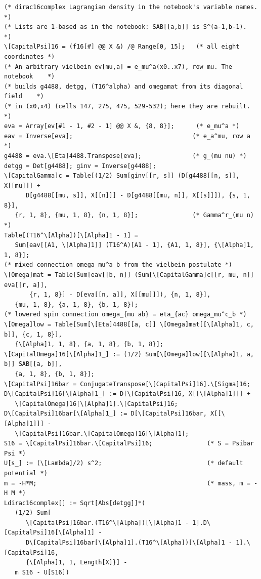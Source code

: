 \documentclass[11pt]{article}
\begin{document}
\begin{Verbatim}[fontsize=\small]
(* dirac16complex Lagrangian density in the notebook's variable names.     *)
(* Lists are 1-based as in the notebook: SAB[[a,b]] is S^(a-1,b-1).        *)
\[CapitalPsi]16 = (f16[#] @@ X &) /@ Range[0, 15];   (* all eight coordinates *)
(* An arbitrary vielbein ev[mu,a] = e_mu^a(x0..x7), row mu. The notebook    *)
(* builds g4488, detgg, (T16^alpha) and omegamat from its diagonal field    *)
(* in (x0,x4) (cells 147, 275, 475, 529-532); here they are rebuilt.        *)
eva = Array[ev[#1 - 1, #2 - 1] @@ X &, {8, 8}];      (* e_mu^a *)
eav = Inverse[eva];                                 (* e_a^mu, row a *)
g4488 = eva.\[Eta]4488.Transpose[eva];              (* g_(mu nu) *)
detgg = Det[g4488]; ginv = Inverse[g4488];
\[CapitalGamma]c = Table[(1/2) Sum[ginv[[r, s]] (D[g4488[[n, s]], X[[mu]]] +
      D[g4488[[mu, s]], X[[n]]] - D[g4488[[mu, n]], X[[s]]]), {s, 1, 8}],
   {r, 1, 8}, {mu, 1, 8}, {n, 1, 8}];               (* Gamma^r_(mu n) *)
Table[(T16^\[Alpha])[\[Alpha]1 - 1] =
   Sum[eav[[A1, \[Alpha]1]] (T16^A)[A1 - 1], {A1, 1, 8}], {\[Alpha]1, 1, 8}];
(* mixed connection omega_mu^a_b from the vielbein postulate *)
\[Omega]mat = Table[Sum[eav[[b, n]] (Sum[\[CapitalGamma]c[[r, mu, n]] eva[[r, a]],
       {r, 1, 8}] - D[eva[[n, a]], X[[mu]]]), {n, 1, 8}],
   {mu, 1, 8}, {a, 1, 8}, {b, 1, 8}];
(* lowered spin connection omega_{mu ab} = eta_{ac} omega_mu^c_b *)
\[Omega]low = Table[Sum[\[Eta]4488[[a, c]] \[Omega]mat[[\[Alpha]1, c, b]], {c, 1, 8}],
   {\[Alpha]1, 1, 8}, {a, 1, 8}, {b, 1, 8}];
\[CapitalOmega]16[\[Alpha]1_] := (1/2) Sum[\[Omega]low[[\[Alpha]1, a, b]] SAB[[a, b]],
   {a, 1, 8}, {b, 1, 8}];
\[CapitalPsi]16bar = ConjugateTranspose[\[CapitalPsi]16].\[Sigma]16;
D\[CapitalPsi]16[\[Alpha]1_] := D[\[CapitalPsi]16, X[[\[Alpha]1]]] +
   \[CapitalOmega]16[\[Alpha]1].\[CapitalPsi]16;
D\[CapitalPsi]16bar[\[Alpha]1_] := D[\[CapitalPsi]16bar, X[[\[Alpha]1]]] -
   \[CapitalPsi]16bar.\[CapitalOmega]16[\[Alpha]1];
S16 = \[CapitalPsi]16bar.\[CapitalPsi]16;               (* S = Psibar Psi *)
U[s_] := (\[Lambda]/2) s^2;                             (* default potential *)
m = -H*M;                                               (* mass, m = -H M *)
Ldirac16complex[] := Sqrt[Abs[detgg]]*(
   (1/2) Sum[
      \[CapitalPsi]16bar.(T16^\[Alpha])[\[Alpha]1 - 1].D\[CapitalPsi]16[\[Alpha]1] -
      D\[CapitalPsi]16bar[\[Alpha]1].(T16^\[Alpha])[\[Alpha]1 - 1].\[CapitalPsi]16,
      {\[Alpha]1, 1, Length[X]}] -
   m S16 - U[S16])
\end{Verbatim}
\end{document}
